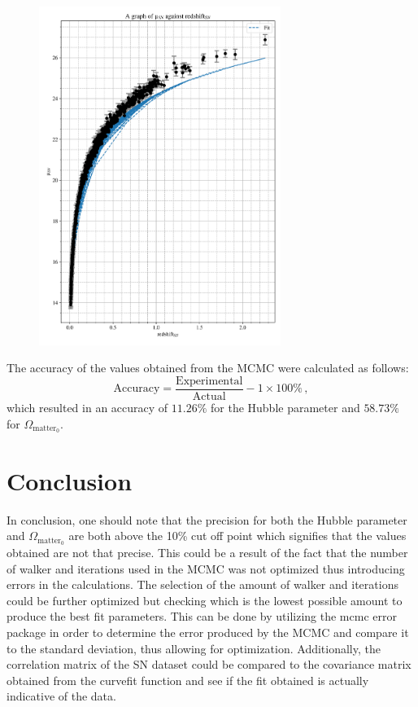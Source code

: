 \documentclass[12pt, a4paper]{article}
\begin{document}
\begin{figure}[H]
    \centering
    \includegraphics[width = 0.7\textwidth]{Graph 5.png}
    \label{fig:final~graph}
\end{figure}

The accuracy of the values obtained from the MCMC were calculated as follows:
\begin{equation}
    \mathrm{Accuracy} = \frac{\mathrm{Experimental}}{\mathrm{Actual}} - 1 \times 100\% \,,
\end{equation}
which resulted in an accuracy of \(11.26\%\) for the Hubble parameter and \(58.73\%\) for \(\Omega_{\mathrm{matter_0}}\).

\section{Conclusion}

In conclusion, one should note that the precision for both the Hubble parameter and \(\Omega_{\mathrm{matter_0}}\) are both above the 10\% cut off point which signifies that the values obtained are not that precise. This could be a result of the fact that the number of walker and iterations used in the MCMC was not optimized thus introducing errors in the calculations. The selection of the amount of walker and iterations could be further optimized but checking which is the lowest possible amount to produce the best fit parameters. This can be done by utilizing the mcmc error package in order to determine the error produced by the MCMC and compare it to the standard deviation, thus allowing for optimization\parencite{MCMCRelatedParameters}. Additionally, the correlation matrix of the SN dataset could be compared to the covariance matrix obtained from the curvefit function and see if the fit obtained is actually indicative of the data.
\end{document}

